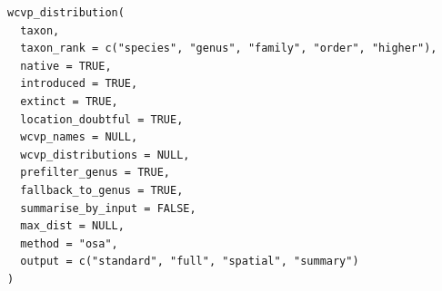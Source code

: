 \documentclass[a4paper]{book}
\begin{document}
%
\begin{Description}
\strong{[Stable]}
\end{Description}
%
\begin{Usage}
\begin{verbatim}
wcvp_distribution(
  taxon,
  taxon_rank = c("species", "genus", "family", "order", "higher"),
  native = TRUE,
  introduced = TRUE,
  extinct = TRUE,
  location_doubtful = TRUE,
  wcvp_names = NULL,
  wcvp_distributions = NULL,
  prefilter_genus = TRUE,
  fallback_to_genus = TRUE,
  summarise_by_input = FALSE,
  max_dist = NULL,
  method = "osa",
  output = c("standard", "full", "spatial", "summary")
)
\end{verbatim}
\end{Usage}
%
\end{document}
